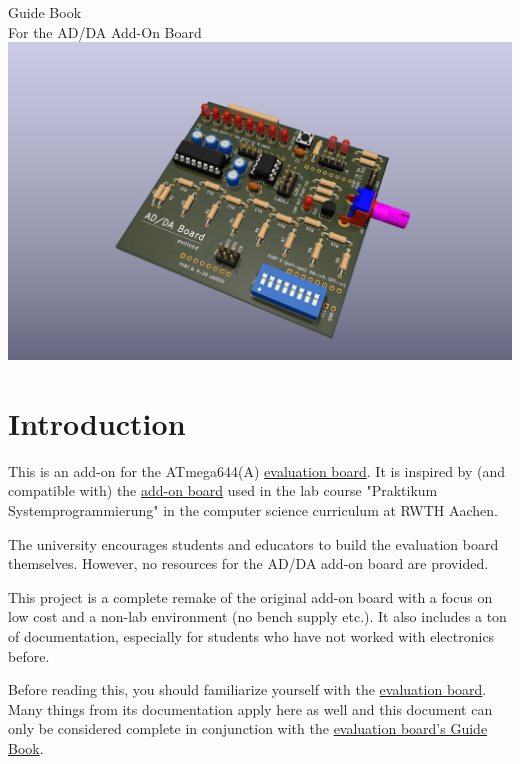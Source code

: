 \documentclass{article}
\newenvironment{note}{\begin{tcolorbox}[colback=blue!5!white,colframe=blue!75!black,title=\textbf{Note}]}{\end{tcolorbox}}
\newcommand{\evaboard}{\href{https://github.com/7vgn/EvaBoard/}{evaluation board}}
\begin{document}
\hypersetup{pageanchor=false}
\begin{titlepage}
\thispagestyle{empty}
\centering
\textsf{\Huge Guide Book}\\[1cm]
\textsf{\Large For the AD/DA Add-On Board}\\[3cm]
\includegraphics[width=\textwidth]{Pictures/ADDABoard3DRender.png}
\end{titlepage}
\hypersetup{pageanchor=true}

\tableofcontents
\section{Introduction}
This is an add-on for the ATmega644(A) \evaboard. It is inspired by (and compatible with) the \href{https://www.embedded.rwth-aachen.de/doku.php?id=lehre:atmegaevaboard}{add-on board} used in the lab course "Praktikum Systemprogrammierung" in the computer science curriculum at RWTH Aachen. 

The university encourages students and educators to build the evaluation board themselves. However, no resources for the AD/DA add-on board are provided. 

This project is a complete remake of the original add-on board with a focus on low cost and a non-lab environment (no bench supply etc.). It also includes a ton of documentation, especially for students who have not worked with electronics before. 

\begin{note}
Before reading this, you should familiarize yourself with the \evaboard. Many things from its documentation apply here as well and this document can only be considered complete in conjunction with the \href{../../EvaBoard/Guide/EvaBoardGuide.pdf}{evaluation board's Guide Book}.
\end{note}
\end{document}
